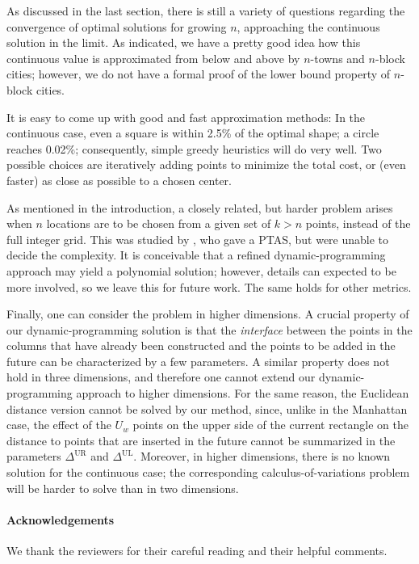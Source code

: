 \documentclass[preprint,authoryear,12pt]{elsarticle}
\begin{document}
As discussed in the last section, there is still a variety of questions
regarding the convergence of optimal solutions for growing $n$,
approaching the continuous solution in the limit.
As indicated, we have a pretty good idea how this continuous value is
approximated from below and above by $n$-towns and $n$-block cities;
however, we do not have a formal proof of the lower bound property
of $n$-block cities.

It is easy to come up with good and fast approximation methods:
In the continuous case, even a square is within 2.5\% of the optimal
shape; a circle reaches 0.02\%; consequently, simple greedy heuristics
will do very well. Two possible choices are iteratively adding points
to minimize the total cost, or (even faster) as close as possible to
a chosen center.

As mentioned in the introduction, a closely related, but harder
problem arises when $n$ locations are to be chosen from a given set of
$k>n$ points, instead of the full integer grid. This was studied by \cite{bender08},
who gave a PTAS, but were unable to decide the complexity.
It is conceivable that a refined dynamic-programming approach may
yield a polynomial solution; however, details can expected
to be more involved, so we leave this for future work.
The same holds for other metrics.

Finally, one can consider the problem
in higher dimensions.
A crucial property of our dynamic-programming solution
is that the \emph{interface} between the points in
the columns that have already been constructed and
the points to be added in the future can be characterized by
a few parameters.
A similar property does not hold in three dimensions,
and therefore one cannot extend our
 dynamic-programming approach to higher dimensions.
For the same reason, the Euclidean distance version
cannot be solved by our method, since, unlike in the Manhattan
case, the effect of the $U_w$ points on the upper
side of the current rectangle on the distance to points that are
inserted in the future cannot be summarized in the parameters
$\Delta^{\mathrm{UR}}$
and
$\Delta^{\mathrm{UL}}$.
Moreover, in higher dimensions, there is no known solution for the
continuous case; the corresponding calculus-of-variations problem
will be harder to solve than in two dimensions.

\paragraph{Acknowledgements}
We thank the reviewers for their careful reading and their helpful comments.
\end{document}
